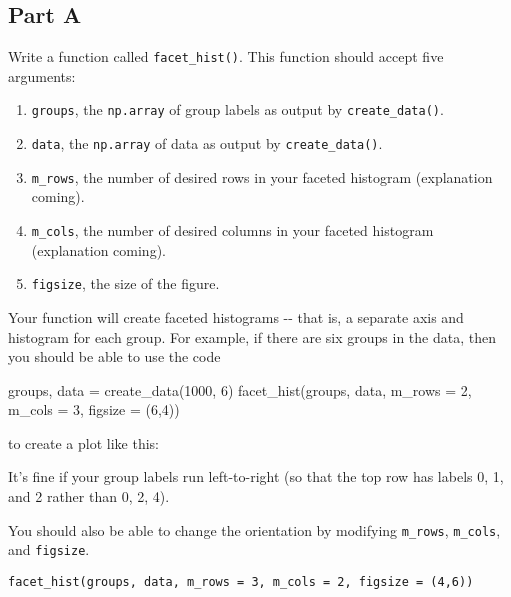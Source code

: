 \documentclass[11pt]{article}
\providecommand{\tightlist}{%
      \setlength{\itemsep}{0pt}\setlength{\parskip}{0pt}}
\newenvironment{Shaded}{}{}
\newcommand{\DecValTok}[1]{\textcolor[rgb]{0.25,0.63,0.44}{{#1}}}
\newcommand{\NormalTok}[1]{{#1}}
\newcommand{\OperatorTok}[1]{\textcolor[rgb]{0.40,0.40,0.40}{{#1}}}
\begin{document}
    \subsection{Part A}\label{part-a}

Write a function called \texttt{facet\_hist()}. This function should
accept five arguments:

\begin{enumerate}
\def\labelenumi{\arabic{enumi}.}
\tightlist
\item
  \texttt{groups}, the \texttt{np.array} of group labels as output by
  \texttt{create\_data()}.
\item
  \texttt{data}, the \texttt{np.array} of data as output by
  \texttt{create\_data()}.
\item
  \texttt{m\_rows}, the number of desired rows in your faceted histogram
  (explanation coming).
\item
  \texttt{m\_cols}, the number of desired columns in your faceted
  histogram (explanation coming).
\item
  \texttt{figsize}, the size of the figure.
\end{enumerate}

Your function will create faceted histograms -\/- that is, a separate
axis and histogram for each group. For example, if there are six groups
in the data, then you should be able to use the code

\begin{Shaded}
\begin{Highlighting}[]
\NormalTok{groups, data }\OperatorTok{=}\NormalTok{ create_data(}\DecValTok{1000}\NormalTok{, }\DecValTok{6}\NormalTok{)}
\NormalTok{facet_hist(groups, data, m_rows }\OperatorTok{=} \DecValTok{2}\NormalTok{, m_cols }\OperatorTok{=} \DecValTok{3}\NormalTok{, figsize }\OperatorTok{=}\NormalTok{ (}\DecValTok{6}\NormalTok{,}\DecValTok{4}\NormalTok{))}
\end{Highlighting}
\end{Shaded}

to create a plot like this:

It's fine if your group labels run left-to-right (so that the top row
has labels 0, 1, and 2 rather than 0, 2, 4).

You should also be able to change the orientation by modifying
\texttt{m\_rows}, \texttt{m\_cols}, and \texttt{figsize}.

\begin{verbatim}
facet_hist(groups, data, m_rows = 3, m_cols = 2, figsize = (4,6))
\end{verbatim}
\end{document}
